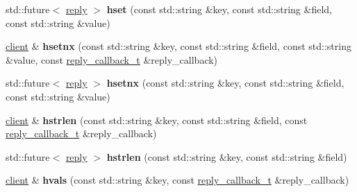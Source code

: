 \begin{DoxyCompactItemize}
\mbox{\label{classcpp__redis_1_1client_ae212c8371dbd9ceff386f789226eb173}} 
std\+::future$<$ \mbox{\hyperlink{classcpp__redis_1_1reply}{reply}} $>$ {\bfseries hset} (const std\+::string \&key, const std\+::string \&field, const std\+::string \&value)
\item 
\mbox{\label{classcpp__redis_1_1client_a6cf21d60012fc82075deb801a32e8d60}} 
\mbox{\hyperlink{classcpp__redis_1_1client}{client}} \& {\bfseries hsetnx} (const std\+::string \&key, const std\+::string \&field, const std\+::string \&value, const \mbox{\hyperlink{classcpp__redis_1_1client_af7a65eb21aa25230bfbb0b0203c4fc04}{reply\+\_\+callback\+\_\+t}} \&reply\+\_\+callback)
\item 
\mbox{\label{classcpp__redis_1_1client_a72b5a16cc761f51e9986bcfcf644e999}} 
std\+::future$<$ \mbox{\hyperlink{classcpp__redis_1_1reply}{reply}} $>$ {\bfseries hsetnx} (const std\+::string \&key, const std\+::string \&field, const std\+::string \&value)
\item 
\mbox{\label{classcpp__redis_1_1client_a5e1543cd782d3ff9d17de5e200fd038a}} 
\mbox{\hyperlink{classcpp__redis_1_1client}{client}} \& {\bfseries hstrlen} (const std\+::string \&key, const std\+::string \&field, const \mbox{\hyperlink{classcpp__redis_1_1client_af7a65eb21aa25230bfbb0b0203c4fc04}{reply\+\_\+callback\+\_\+t}} \&reply\+\_\+callback)
\item 
\mbox{\label{classcpp__redis_1_1client_a612c5f64a9fec6c8c2df8b113173146a}} 
std\+::future$<$ \mbox{\hyperlink{classcpp__redis_1_1reply}{reply}} $>$ {\bfseries hstrlen} (const std\+::string \&key, const std\+::string \&field)
\item 
\mbox{\label{classcpp__redis_1_1client_af74a8adbcd6f21178b43f3f2edddb472}} 
\mbox{\hyperlink{classcpp__redis_1_1client}{client}} \& {\bfseries hvals} (const std\+::string \&key, const \mbox{\hyperlink{classcpp__redis_1_1client_af7a65eb21aa25230bfbb0b0203c4fc04}{reply\+\_\+callback\+\_\+t}} \&reply\+\_\+callback)
\item 
\mbox{\label{classcpp__redis_1_1client_af391940cf5b996a0682e881da446b7da}} 

\end{DoxyCompactItemize}
